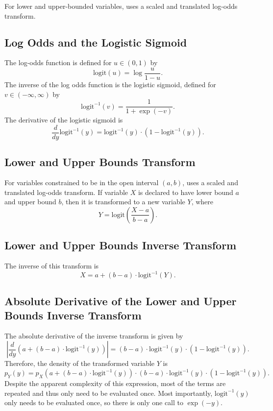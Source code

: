 For lower and upper-bounded variables, \Stan uses a scaled and
translated log-odds transform.

\subsection{Log Odds and the Logistic Sigmoid}

The log-odds function is defined for $u \in (0,1)$ by
%
\[
\mbox{logit}(u) = \log \frac{u}{1 - u}.
\]
%
The inverse of the log odds function is the logistic sigmoid, defined
for $v \in (-\infty,\infty)$ by
%
\[
\mbox{logit}^{-1}(v) = \frac{1}{1 + \exp(-v)}.
\]
%
The derivative of the logistic sigmoid is
%
\[
\frac{d}{dy} \mbox{logit}^{-1}(y)
= \mbox{logit}^{-1}(y) \cdot \left( 1 - \mbox{logit}^{-1}(y) \right).
\]

\subsection{Lower and Upper Bounds Transform}

For variables constrained to be in the open interval $(a,b)$, \Stan
uses a scaled and translated log-odds transform.  If variable $X$ is
declared to have lower bound $a$ and upper bound $b$, then it is
transformed to a new variable $Y$, where
%
\[
Y = \mbox{logit} \left( \frac{X - a}{b - a} \right).
\]
%

\subsection{Lower and Upper Bounds Inverse Transform}

The inverse of this transform is
%
\[
X = a + (b - a) \cdot \mbox{logit}^{-1}(Y).
\]
%

\subsection{Absolute Derivative of the Lower and Upper Bounds Inverse
  Transform}

The absolute derivative of the inverse transform is given by
\[
\left|
  \frac{d}{dy}
    \left(
      a + (b - a) \cdot \mbox{logit}^{-1}(y)
    \right)
  \right|
= (b - a)
    \cdot \mbox{logit}^{-1}(y)
    \cdot \left( 1 - \mbox{logit}^{-1}(y) \right).
\]
Therefore, the density of the transformed variable $Y$ is
%
\[
p_Y(y)
=
 p_X \! \left( a + (b - a) \cdot \mbox{logit}^{-1}(y) \right)
    \cdot (b - a)
    \cdot \mbox{logit}^{-1}(y)
    \cdot \left( 1 - \mbox{logit}^{-1}(y) \right).
\]
%
Despite the apparent complexity of this expression, most of the terms
are repeated and thus only need to be evaluated once.  Most
importantly, $\mbox{logit}^{-1}(y)$ only needs to be evaluated once,
so there is only one call to $\exp(-y)$.


